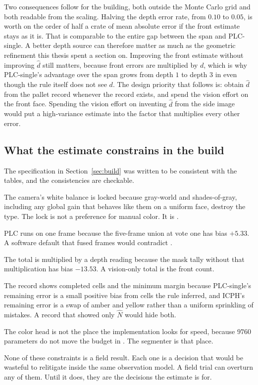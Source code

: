 Two consequences follow for the building, both outside the Monte Carlo grid and both readable from the scaling. Halving the depth error rate, from $0.10$ to $0.05$, is worth on the order of half a crate of mean absolute error if the front estimate stays as it is. That is comparable to the entire gap between the span and PLC-single. A better depth source can therefore matter as much as the geometric refinement this thesis spent a section on. Improving the front estimate without improving $\hat{d}$ still matters, because front errors are multiplied by $d$, which is why PLC-single's advantage over the span grows from depth $1$ to depth $3$ in  even though the rule itself does not see $d$. The design priority that follows is: obtain $\hat{d}$ from the pallet record whenever the record exists, and spend the vision effort on the front face. Spending the vision effort on inventing $\hat{d}$ from the side image would put a high-variance estimate into the factor that multiplies every other error.

\subsection{What the estimate constrains in the build}
\label{sec:constraints}

The specification in Section~\ref{sec:build} was written to be consistent with the tables, and the consistencies are checkable.

The camera's white balance is locked because gray-world and shades-of-gray, including any global gain that behaves like them on a uniform face, destroy the type. The lock is not a preference for manual color. It is .

PLC runs on one frame because the five-frame union at vote one has bias $+5.33$. A software default that fused frames would contradict .

The total is multiplied by a depth reading because the mask tally without that multiplication has bias $-13.53$. A vision-only total is the front count.

The record shows completed cells and the minimum margin because PLC-single's remaining error is a small positive bias from cells the rule inferred, and ICPH's remaining error is a swap of amber and yellow rather than a uniform sprinkling of mistakes. A record that showed only $\hat{N}$ would hide both.

The color head is not the place the implementation looks for speed, because $9760$ parameters do not move the budget in . The segmenter is that place.

None of these constraints is a field result. Each one is a decision that would be wasteful to relitigate inside the same observation model. A field trial can overturn any of them. Until it does, they are the decisions the estimate is for.
